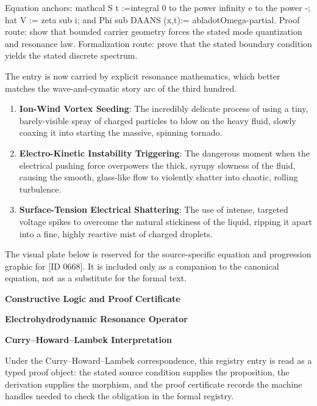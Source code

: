 Equation anchors: mathcal S t :=integral 0 to the power infinity e to the power -; hat V := zeta sub i; and Phi sub DAANS (x,t):= abladotOmega-partial. Proof route: show that bounded carrier geometry forces the stated mode quantization and resonance law. Formalization route: prove that the stated boundary condition yields the stated discrete spectrum.

The entry is now carried by explicit resonance mathematics, which better matches the wave-and-cymatic story arc of the third hundred.
\endgroup

\begin{enumerate}[leftmargin=1.6em,itemsep=6pt,topsep=4pt]
\item \textbf{Ion-Wind Vortex Seeding}: The incredibly delicate process of using a tiny, barely-visible spray of charged particles to blow on the heavy fluid, slowly coaxing it into starting the massive, spinning tornado.
\item \textbf{Electro-Kinetic Instability Triggering}: The dangerous moment when the electrical pushing force overpowers the thick, syrupy slowness of the fluid, causing the smooth, glass-like flow to violently shatter into chaotic, rolling turbulence.
\item \textbf{Surface-Tension Electrical Shattering}: The use of intense, targeted voltage spikes to overcome the natural stickiness of the liquid, ripping it apart into a fine, highly reactive mist of charged droplets.
\end{enumerate}

\begingroup\footnotesize\sloppy
The visual plate below is reserved for the source-specific equation and progression graphic for [ID 0668]. It is included only as a companion to the canonical equation, not as a substitute for the formal text.
\par\endgroup
\ifTZPDarkEdition
{}
\fi

\clearpage
\begingroup\tzpsupportsetup
\noindent\textbf{\fontsize{10.8pt}{12.8pt}\selectfont [ID 0668] Constructive Logic and Proof Certificate}\par
\noindent\textbf{\fontsize{10pt}{12pt}\selectfont Electrohydrodynamic Resonance Operator}\par
\vspace{0.45em}
\begingroup
\footnotesize
\setlength{\parskip}{0.22em}
\setlength{\parindent}{0pt}
\noindent\textbf{Curry--Howard--Lambek Interpretation}\par
Under the Curry--Howard--Lambek correspondence, this registry entry is read as a typed proof
object: the stated source condition supplies the proposition, the derivation supplies the
morphism, and the proof certificate records the machine handles needed to check the obligation
in the formal registry.

